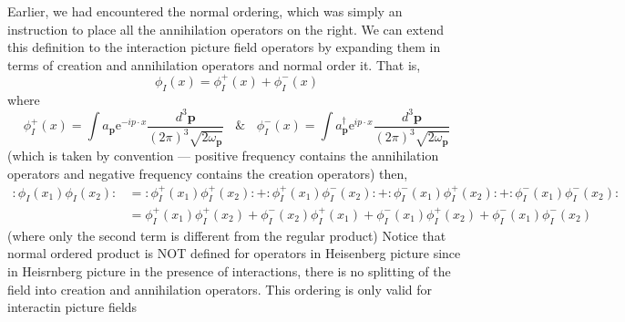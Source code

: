 \documentclass[11pt]{article}
\newcommand{\e}{\mathrm{e}}
\newcommand{\w}{\omega}
\newcommand{\normord}[1]{:\mathrel{#1}:}
\renewcommand{\a}[1]{a_\mathbf{#1}}
\newcommand{\adag}[1]{a^\dagger_\mathbf{#1}}
\numberwithin{equation}{section}
\begin{document}
    Earlier, we had encountered the normal ordering, which was simply an instruction to place all the annihilation operators on the right. We can extend this definition to the interaction picture field operators by expanding them in terms of creation and annihilation operators and normal order it. That is, 
    \begin{equation*}
        \phi_I(x) = \phi_I^+(x) + \phi_I^-(x)
    \end{equation*}
    where 
    \begin{equation*}
        \phi_I^+(x) = \int \a{p}\e^{-ip\cdot x} \frac{d^3\textbf{p}}{(2\pi)^3 \sqrt{2\w_\textbf{p}}}~~~~\&~~~~\phi_I^-(x) = \int \adag{p}\e^{ip\cdot x} \frac{d^3\textbf{p}}{(2\pi)^3 \sqrt{2\w_\textbf{p}}}
    \end{equation*}
    (which is taken by convention — positive frequency contains the annihilation operators and negative frequency contains the creation operators) then, 
    \begin{align*}
        \normord{\phi_I(x_1) \phi_I(x_2)} &= \normord{\phi_I^+(x_1)\phi_I^+(x_2)} + \normord{\phi_I^+(x_1)\phi_I^-(x_2)} + \normord{\phi_I^-(x_1)\phi_I^+(x_2)} + \normord{\phi_I^-(x_1)\phi_I^-(x_2)}\\
        &= \phi_I^+(x_1)\phi_I^+(x_2) + \phi_I^-(x_2)\phi_I^+(x_1) + \phi_I^-(x_1)\phi_I^+(x_2) + \phi_I^-(x_1)\phi_I^-(x_2)
    \end{align*}
    (where only the second term is different from the regular product)
    Notice that normal ordered product is NOT defined for operators in Heisenberg picture since in Heisrnberg picture in the presence of interactions, there is no splitting of the field into creation and annihilation operators. This ordering is only valid for interactin picture fields\\
\end{document}
